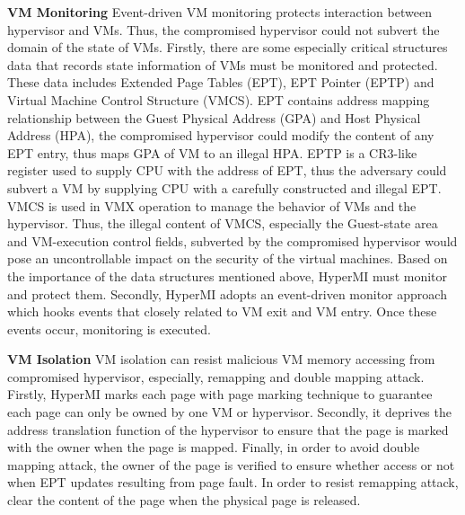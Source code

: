 \documentclass[conference]{IEEEtran}
\begin{document}
\textbf{VM Monitoring}
Event-driven VM monitoring protects interaction between hypervisor and VMs. Thus, the compromised hypervisor could not subvert the domain of the state of VMs. 
Firstly, there are some especially critical structures data that records state information of VMs must be monitored and protected. These data includes Extended Page Tables (EPT), EPT Pointer (EPTP) and Virtual Machine Control Structure (VMCS). EPT contains address mapping relationship between the Guest Physical Address (GPA) and Host Physical Address (HPA), the compromised hypervisor could modify the content of any EPT entry, thus maps GPA of VM to an illegal HPA. EPTP is a CR3-like register used to supply CPU with the address of EPT, thus the adversary could subvert a VM by supplying CPU with a carefully constructed and illegal EPT. VMCS is used in VMX operation to manage the behavior of VMs and the hypervisor. Thus, the illegal content of VMCS, especially the Guest-state area and VM-execution control fields, subverted by the compromised hypervisor would pose an uncontrollable impact on the security of the virtual machines. 
Based on the importance of the data structures mentioned above, HyperMI must monitor and protect them. 
Secondly, HyperMI adopts an event-driven monitor approach which hooks events that closely related to VM exit and VM entry. Once these events occur, monitoring is executed. 

\textbf{VM Isolation}
VM isolation can resist malicious VM memory accessing from compromised hypervisor, especially, remapping and double mapping attack.
Firstly, HyperMI marks each page with page marking technique to guarantee each page can only be owned by one VM or hypervisor.
Secondly, it deprives the address translation function of the hypervisor to ensure that the page is marked with the owner when the page is mapped. 
Finally, in order to avoid double mapping attack, the owner of the page is verified to ensure whether access or not when EPT updates resulting from page fault. In order to resist remapping attack, clear the content of the page when the physical page is released.
\end{document}

